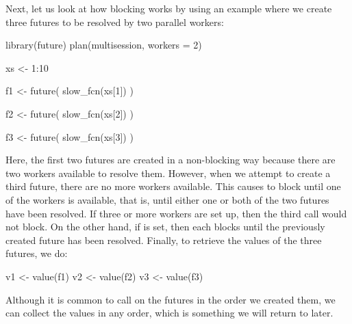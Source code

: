 Next, let us look at how blocking works by using an example where we
create three futures to be resolved by two parallel workers:
%
\begin{example}
library(future)
plan(multisession, workers = 2)

xs <- 1:10

f1 <- future({
  slow_fcn(xs[1])
})

f2 <- future({
  slow_fcn(xs[2])
})

f3 <- future({
  slow_fcn(xs[3])
})
\end{example}
%
Here, the first two futures are created in a non-blocking way because
there are two workers available to resolve them.  However, when we
attempt to create a third future, there are no more workers available.
This causes
 to block until one of the workers is available, that is,
until either one or both of the two futures have been resolved.  If
three or more workers are set up, then the third  call
would not block.  On the other hand, if  is
set, then each  blocks until the previously created
future has been resolved.
%
Finally, to retrieve the values of the three futures, we do:
\begin{example}
v1 <- value(f1)
v2 <- value(f2)
v3 <- value(f3)
\end{example}
Although it is common to call  on the futures in the
order we created them, we can collect the values in any order, which
is something we will return to later.

